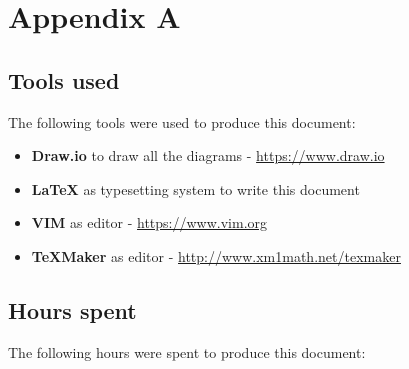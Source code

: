 \newpage
\section*{Appendix A}
\subsection*{Tools used}
The following tools were used to produce this document:
\begin{itemize}
    \item \textbf{Draw.io} to draw all the diagrams - \url{https://www.draw.io}
    \item \textbf{LaTeX} as typesetting system to write this document
    \item \textbf{VIM} as editor - \url{https://www.vim.org}
    \item \textbf{TeXMaker} as editor - \url{http://www.xm1math.net/texmaker}
\end{itemize}

\subsection*{Hours spent}
The following hours were spent to produce this document:
